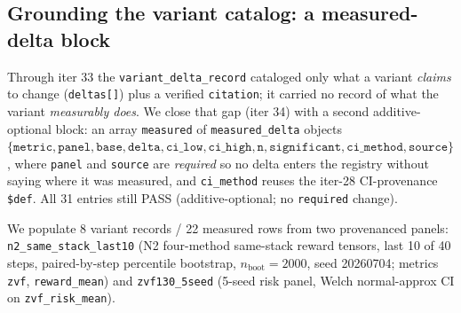 \subsection{Grounding the variant catalog: a measured-delta block}
\label{sec:p6-measured-delta-block}

Through iter 33 the \texttt{variant\_delta\_record} cataloged only what a
variant \emph{claims} to change (\texttt{deltas[]}) plus a verified
\texttt{citation}; it carried no record of what the variant
\emph{measurably does}. We close that gap (iter 34) with a second
additive-optional block: an array \texttt{measured} of
\texttt{measured\_delta} objects
$\{\texttt{metric},\texttt{panel},\texttt{base},\texttt{delta},
\texttt{ci\_low},\texttt{ci\_high},\texttt{n},\texttt{significant},
\texttt{ci\_method},\texttt{source}\}$, where \texttt{panel} and
\texttt{source} are \emph{required} so no delta enters the registry
without saying where it was measured, and \texttt{ci\_method} reuses the
iter-28 CI-provenance \texttt{\$def}. All 31 entries still PASS
(additive-optional; no \texttt{required} change).

We populate 8 variant records / 22 measured rows from two provenanced
panels: \texttt{n2\_same\_stack\_last10} (N2 four-method same-stack
reward tensors, last 10 of 40 steps, paired-by-step percentile bootstrap,
$n_{\text{boot}}{=}2000$, seed 20260704; metrics \texttt{zvf},
\texttt{reward\_mean}) and \texttt{zvf130\_5seed} (5-seed risk panel,
Welch normal-approx CI on \texttt{zvf\_risk\_mean}).

